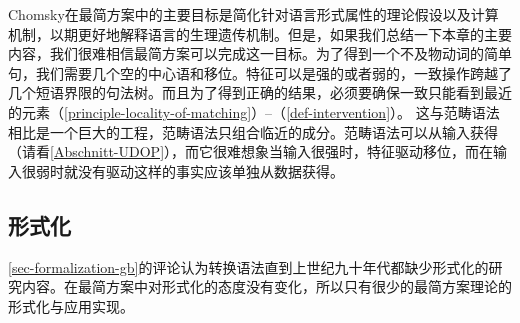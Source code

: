 Chomsky在最简方案中的主要目标是简化针对语言形式属性的理论假设以及计算机制，以期更好地解释语言的生理遗传机制。但是，如果我们总结一下本章的主要内容，我们很难相信最简方案可以完成这一目标。为了得到一个不及物动词的简单句，我们需要几个空的中心语和移位。特征可以是强的或者弱的，一致操作跨越了几个短语界限的句法树。而且为了得到正确的结果，必须要确保一致只能看到最近的元素（\ref{principle-locality-of-matching}）--（\ref{def-intervention}）。
这与范畴语法相比是一个巨大的工程，范畴语法只组合临近的成分。范畴语法可以从输入获得（请看\ref{Abschnitt-UDOP}），而它很难想象当输入很强时，特征驱动移位，而在输入很弱时就没有驱动这样的事实应该单独从数据获得。

\subsection{形式化}
\label{sec-formalization-minimalism}

\ref{sec-formalization-gb}的评论认为转换语法直到上世纪九十年代都缺少形式化的研究内容。在最简方案中对形式化的态度没有变化，所以只有很少的最简方案理论的形式化与应用实现。

